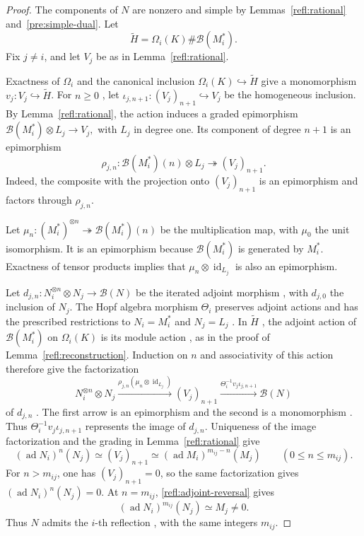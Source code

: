 \documentclass[11pt, a4paper]{article}
\numberwithin{equation}{section}
\newcommand{\B}{\mathcal B}
\DeclareMathOperator{\id}{id}
\DeclareMathOperator{\ad}{ad}
\begin{document}
\begin{proof}
The components of $N$ are nonzero and simple by
Lemmas~\ref{refl:rational} and~\ref{pre:simple-dual}.
 Let
\[
 \widetilde{H}=\Omega_i(K)\#\B(M_i^*).
\]
Fix $j\neq i$, and let $V_j$ be as in
Lemma~\ref{refl:rational}.

 {Exactness of} $  \Omega_i   $  {and the canonical} inclusion
$\Omega_i(K)  \hookrightarrow   \widetilde{H}$  {give} a monomorphism
$v_j:V_j\hookrightarrow\widetilde{H}$.
 {For} $  {{n}}\geq0   $ {, let}
$\iota_{j,{{n}}+1}:(V_j)_{{{n}}+1}\hookrightarrow V_j$
 {be} the homogeneous  {inclusion}.
By Lemma~\ref{refl:rational}, the action induces a graded
epimorphism
$
 \B(M_i^*)\otimes L_j\longrightarrow V_j,
$
 {with} $L_j$  {in} degree one. Its component of degree ${{n}}+1$
is an epimorphism
\[
 \rho_{j,{{n}}}:\B(M_i^*)({{n}})\otimes L_j
 \twoheadrightarrow (V_j)_{{{n}}+1}.
\]
Indeed, the  {composite} with the projection onto $(V_j)_{{{n}}+1}$
 {is} an epimorphism  {and} factors through $\rho_{j,{{n}}}$.

Let
$
 \mu_{{n}}:(M_i^*)^{\otimes {{n}}}
 \twoheadrightarrow\B(M_i^*)({{n}})
$
be the multiplication map, with $\mu_0$ the unit isomorphism.
It is an epimorphism because $\B(M_i^*)$ is generated by
$M_i^*$.
Exactness of tensor products implies that
$\mu_{{n}}\otimes\id_{L_j}$ is also an epimorphism.

Let $d_{j,{{n}}}:N_i^{\otimes {{n}}}\otimes N_j  \to   \B(N)$
be the iterated adjoint morphism {, with} $d_{j,0}$ the inclusion
of $N_j$.  {The} Hopf algebra morphism $  \Theta_i   $ preserves
 {adjoint actions and has} the  {prescribed} restrictions to
$N_i=M_i^*$ and $N_j=L_j$ {.
In} $  \widetilde{H}   $ {,} the adjoint action of $\B(M_i^*)$ on
$\Omega_i(K)$ is its module action { , as in the proof of
Lemma~\ref{refl:reconstruction}}.
 {Induction} on ${{n}}$  {and associativity} of  {this} action  {therefore
give} the factorization
\[
 N_i^{\otimes {{n}}}\otimes N_j
 \xrightarrow{\rho_{j,{{n}}}(\mu_{{n}}\otimes\id_{L_j})}
 (V_j)_{{{n}}+1}
 \xrightarrow{\Theta_i^{-1}v_j\iota_{j,{{n}}+1}}
 \B(N)
\]
 {of} $  d_{j,{{n}}}   $ {.
The first arrow} is an epimorphism  {and the second is} a
monomorphism {. Thus} $  \Theta_i^{-1}v_j\iota_{j,{{n}}+1}   $
 {represents the image of} $d_{j,{{n}}}$.
 {Uniqueness} of the image factorization  {and} the grading in
Lemma~\ref{refl:rational}  {give}
\begin{equation}\label{refl:adjoint-reversal}
 (\ad N_i)^{{n}}(N_j)
 \simeq (V_j)_{{{n}}+1}
 \simeq (\ad M_i)^{m_{ij}-{{n}}}(M_j)
 \qquad(0\leq {{n}}\leq m_{ij}).
\end{equation}
For ${{n}}>m_{ij}$,  {one has} $(V_j)_{{{n}}+1}  =0   $, so the same
factorization gives $(\ad N_i)^{{n}}(N_j)=0$.
At ${{n}}=m_{ij}$, \eqref{refl:adjoint-reversal} gives
\[
 (\ad N_i)^{m_{ij}}(N_j)\simeq M_j\neq0.
\]
Thus $N$ admits the $i$-th reflection {,} with the same
 {integers} $  m_{ij}   $.


\end{proof}
\end{document}

